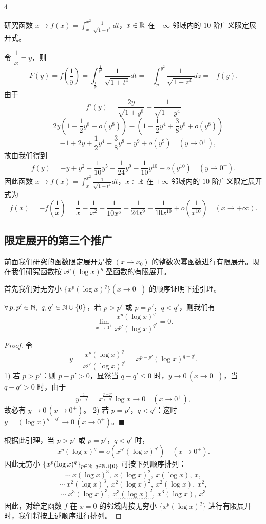\begin{sourceexample}{4}

研究函数 $x\longmapsto f(x)=\displaystyle\int_x^{x^2}\frac{1}{\sqrt{1+t^4}}\,dt$，$x\in\mathbb{R}$ 在 $+\infty$ 邻域内的 $10$ 阶广义限定展开式。

令 $\dfrac{1}{x}=y$，则
\[F(y)=f\left(\frac{1}{y}\right)=\int_{\frac{1}{y}}^{\frac{1}{y^2}}\frac{1}{\sqrt{1+t^4}}dt=-\int_{y}^{y^2}\frac{1}{\sqrt{1+z^4}}dz=-f(y).\]
由于
\[f'(y)=\frac{2y}{\sqrt{1+y^8}}-\frac{1}{\sqrt{1+y^4}}\]
\[=2y\left(1-\frac{1}{2}y^8+o(y^8)\right)-\left(1-\frac{1}{2}y^4+\frac{3}{8}y^8+o(y^8)\right)\]
\[=-1+2y+\frac{1}{2}y^4-\frac{3}{8}y^8-y^9+o(y^9)\quad(y\to0^+),\]
故由我们得到
\[f(y)=-y+y^2+\frac{1}{10}y^5-\frac{1}{24}y^9-\frac{1}{10}y^{10}+o(y^{10})\quad(y\to0^+).\]
因此函数 $x\longmapsto f(x)=\displaystyle\int_x^{x^2}\frac{1}{\sqrt{1+t^4}}dt$，$x\in\mathbb{R}$ 在 $+\infty$ 邻域内的 $10$ 阶广义限定展开式为
\[f(x)=-f\left(\frac{1}{x}\right)=\frac{1}{x}-\frac{1}{x^2}-\frac{1}{10x^5}+\frac{1}{24x^9}+\frac{1}{10x^{10}}+o\left(\frac{1}{x^{10}}\right)\quad(x\to+\infty).\]

\end{sourceexample}

\subsection{限定展开的第三个推广}

前面我们研究的函数限定展开是按 $(x\to x_0)$ 的整数次幂函数进行有限展开。现在我们研究函数按 $x^p(\log x)^q$ 型函数的有限展开。

首先我们对无穷小 $\{x^p(\log x)^q\}(x\to0^+)$ 的顺序证明下述引理。

\begin{mylemma*}{}

$\forall\,p,p'\in\N,\ q,q'\in\N\cup\{0\}$，若 $p>p'$ 或 $p=p'$，$q<q'$，则我们有
\[\lim_{x\to0^+}\frac{x^p(\log x)^q}{x^{p'}(\log x)^{q'}}=0.\]

\end{mylemma*}

\begin{proof}

令
\[y=\frac{x^p(\log x)^q}{x^{p'}(\log x)^{q'}}=x^{p-p'}(\log x)^{q-q'}.\]
1) 若 $p>p'$：则 $p-p'>0$，显然当 $q-q'\leqslant0$ 时，$y\to0\,(x\to0^+)$，当 $q-q'>0$ 时，由于
\[y^{\frac{1}{q-q'}}=x^{\frac{p-p'}{q-q'}}\log x\to0\quad(x\to0^+),\]
故必有 $y\to0\,(x\to0^+)$。
2) 若 $p=p'$，$q<q'$：这时 $y=(\log x)^{q-q'}\to0\,(x\to0^+)$。$\blacksquare$

根据此引理，当 $p>p'$ 或 $p=p'$，$q<q'$ 时，
\[x^{p}(\log x)^{q}=o(x^{p'}(\log x)^{q'})\quad(x\to0^{+}).\]
因此无穷小 $\{x^p(\log x)^q\}_{p\in\N;\ q\in\N\cup\{0\}}$ 可按下列顺序排列：
\[\cdots\ x(\log x)^3,\ x(\log x)^2,\ x(\log x),\ x,\]
\[\cdots\ x^{2}(\log x)^{3},\ x^{2}(\log x)^{2},\ x^{2}(\log x),\ x^{2},\]
\[\cdots\ x^{3}(\log x)^{3},\ x^{3}(\log x)^{2},\ x^{3}(\log x),\ x^{3}\]
\[\cdots\cdots\cdots\cdots\cdots\cdots\cdots\]
因此，对给定函数 $f$ 在 $x=0$ 的邻域内按无穷小 $\{x^p(\log x)^q\}$ 进行有限展开时，我们将按上述顺序进行排列。

\end{proof}

